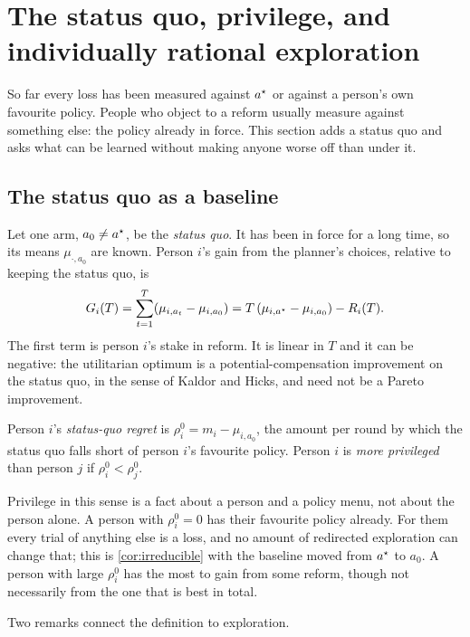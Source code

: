\section{The status quo, privilege, and individually rational exploration}\label{sec:sq}

So far every loss has been measured against $a^\star$ or against a person's own favourite policy. People who object to a reform usually measure against something else: the policy already in force. This section adds a status quo and asks what can be learned without making anyone worse off than under it.

\subsection{The status quo as a baseline}

Let one arm, $a_0\neq a^\star$, be the \emph{status quo}. It has been in force for a long time, so its means $\mu_{\cdot,a_0}$ are known. Person $i$'s gain from the planner's choices, relative to keeping the status quo, is
\[
  G_i(T)=\sum_{t=1}^T(\mu_{i,a_t}-\mu_{i,a_0})=T\,(\mu_{i,a^\star}-\mu_{i,a_0})-R_i(T).
\]
The first term is person $i$'s stake in reform. It is linear in $T$ and it can be negative: the utilitarian optimum is a potential-compensation improvement on the status quo, in the sense of Kaldor and Hicks, and need not be a Pareto improvement.

\begin{definition}[Privilege]\label{def:privilege}
Person $i$'s \emph{status-quo regret} is $\rho^0_i=m_i-\mu_{i,a_0}$, the amount per round by which the status quo falls short of person $i$'s favourite policy. Person $i$ is \emph{more privileged} than person $j$ if $\rho^0_i<\rho^0_j$.
\end{definition}

Privilege in this sense is a fact about a person and a policy menu, not about the person alone. A person with $\rho^0_i=0$ has their favourite policy already. For them every trial of anything else is a loss, and no amount of redirected exploration can change that; this is \cref{cor:irreducible} with the baseline moved from $a^\star$ to $a_0$. A person with large $\rho^0_i$ has the most to gain from some reform, though not necessarily from the one that is best in total.

Two remarks connect the definition to exploration.


